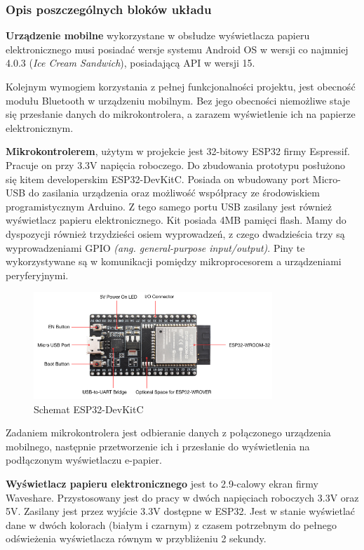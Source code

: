 \documentclass[a4paper,12pt, twoside]{article}
\begin{document}
        \subsubsection{Opis poszczególnych bloków układu}
        \textbf{Urządzenie mobilne} wykorzystane w obsłudze wyświetlacza papieru elektronicznego musi posiadać wersje systemu Android OS w wersji co najmniej 4.0.3 (\textit{Ice Cream Sandwich})\cite{ics}, posiadającą API w wersji 15\cite{api}. 
        
        Kolejnym wymogiem korzystania z pełnej funkcjonalności projektu, jest obecność modułu Bluetooth w urządzeniu mobilnym. Bez jego obecności niemożliwe staje się przesłanie danych do mikrokontrolera, a zarazem wyświetlenie ich na papierze elektronicznym.
        
    	\textbf{Mikrokontrolerem}, użytym w projekcie jest 32-bitowy ESP32 firmy Espressif. Pracuje on przy 3.3V napięcia roboczego. Do zbudowania prototypu posłużono się kitem developerskim ESP32-DevKitC. Posiada on wbudowany port Micro-USB do zasilania urządzenia oraz możliwość współpracy ze środowiskiem programistycznym Arduino. Z tego samego portu USB zasilany jest również wyświetlacz papieru elektronicznego. Kit posiada 4MB pamięci flash\cite{flash}. Mamy do dyspozycji również trzydzieści osiem wyprowadzeń, z czego dwadzieścia trzy są wyprowadzeniami GPIO \textit{(ang. general-purpose input/output)}. Piny te wykorzystywane są w komunikacji pomiędzy mikroprocesorem a urządzeniami peryferyjnymi.
    	\begin{figure}[H]
    	        \centering
    			\includegraphics[width=9cm]{images/rys8_devkit.png}
    			\caption{Schemat ESP32-DevKitC\cite{devkit}}
                \label{fig:devkit}
    	\end{figure}
    	
    	Zadaniem mikrokontrolera jest odbieranie danych z połączonego urządzenia mobilnego, następnie przetworzenie ich i przesłanie do wyświetlenia na podłączonym wyświetlaczu e-papier.
    
        \textbf{Wyświetlacz papieru elektronicznego} jest to 2.9-calowy ekran firmy Waveshare. Przystosowany jest do pracy w dwóch napięciach roboczych 3.3V oraz 5V. Zasilany jest przez wyjście 3.3V dostępne w ESP32. Jest w stanie wyświetlać dane w dwóch kolorach (białym i czarnym) z czasem potrzebnym do pełnego odświeżenia wyświetlacza równym w przybliżeniu 2 sekundy\cite{waveshare}.
        
\end{document}
